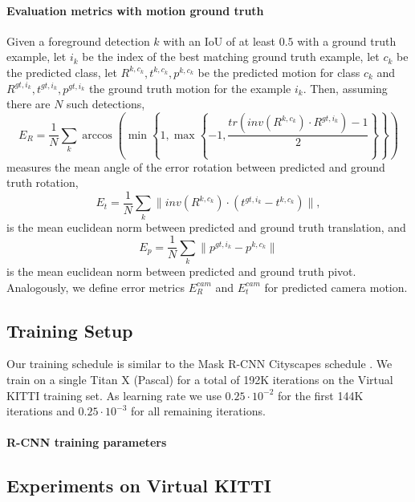 \paragraph{Evaluation metrics with motion ground truth}
Given a foreground detection $k$ with an IoU of at least $0.5$ with a ground truth example,
let $i_k$ be the index of the best matching ground truth example,
let $c_k$ be the predicted class,
let $R^{k,c_k}, t^{k,c_k}, p^{k,c_k}$ be the predicted motion for class $c_k$
and $R^{gt,i_k}, t^{gt,i_k}, p^{gt,i_k}$ the ground truth motion for the example $i_k$.
Then, assuming there are $N$ such detections,
\begin{equation}
E_{R} = \frac{1}{N}\sum_k \arccos\left( \min\left\{1, \max\left\{-1, \frac{tr(inv(R^{k,c_k}) \cdot R^{gt,i_k}) - 1}{2} \right\}\right\} \right)
\end{equation}
measures the mean angle of the error rotation between predicted and ground truth rotation,
\begin{equation}
E_{t} = \frac{1}{N}\sum_k  \lVert inv(R^{k,c_k}) \cdot (t^{gt,i_k} - t^{k,c_k}) \rVert,
\end{equation}
is the mean euclidean norm between predicted and ground truth translation, and
\begin{equation}
E_{p} = \frac{1}{N}\sum_k \lVert p^{gt,i_k} - p^{k,c_k} \rVert
\end{equation}
is the mean euclidean norm between predicted and ground truth pivot.
Analogously, we define error metrics $E_{R}^{cam}$ and $E_{t}^{cam}$ for
predicted camera motion.

\subsection{Training Setup}
Our training schedule is similar to the Mask R-CNN Cityscapes schedule \cite{MaskRCNN}.
We train on a single Titan X (Pascal) for a total of 192K iterations on the
Virtual KITTI training set. As learning rate we use $0.25 \cdot 10^{-2}$ for the
first 144K iterations and $0.25 \cdot 10^{-3}$ for all remaining iterations.

\paragraph{R-CNN training parameters}

\subsection{Experiments on Virtual KITTI}

